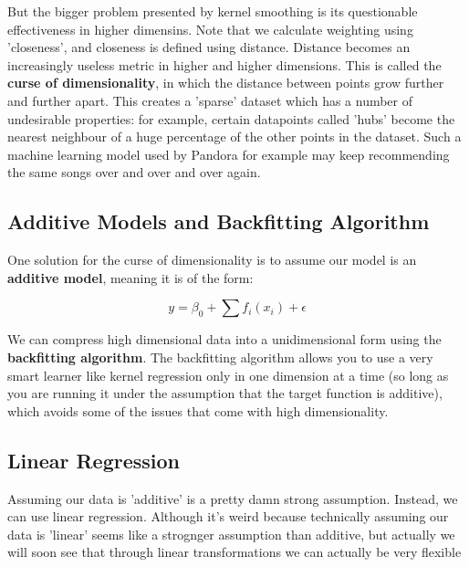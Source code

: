 \documentclass[12pt]{article}
\begin{document}
But the bigger problem presented by kernel smoothing is its questionable effectiveness in higher dimensins. Note that we calculate weighting using 'closeness', and closeness is defined using distance. Distance becomes an increasingly useless metric in higher and higher dimensions. This is called the \textbf{curse of dimensionality}, in which the distance between points grow further and further apart. This creates a 'sparse' dataset which has a number of undesirable properties: for example, certain datapoints called 'hubs' become the nearest neighbour of a huge percentage of the other points in the dataset. Such a machine learning model used by Pandora for example may keep recommending the same songs over and over and over again. \\


\subsection{Additive Models and Backfitting Algorithm}

One solution for the curse of dimensionality is to assume our model is an \textbf{additive model}, meaning it is of the form:

$$ y = \beta_0 + \sum f_i(x_i) + \epsilon$$ 

We can compress high dimensional data into a unidimensional form using the \textbf{backfitting algorithm}. The backfitting algorithm allows you to use a very smart learner like kernel regression only in one dimension at a time (so long as you are running it under the assumption that the target function is additive), which avoids some of the issues that come with high dimensionality.  


\subsection{Linear Regression}

Assuming our data is 'additive' is a pretty damn strong assumption. Instead, we can use linear regression. Although it's weird because technically assuming our data is 'linear' seems like a strognger assumption than additive, but actually we will soon see that through linear transformations we can actually be very flexible\\
\end{document}

